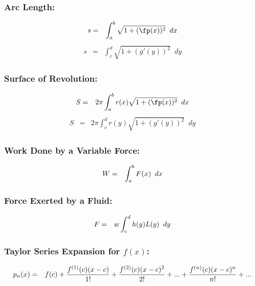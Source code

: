 \documentclass{article}[11pt]
\begin{document}
\pagebreak

\subsubsection*{\large{Arc Length:}}
\vspace{-0.25in}
\begin{eqnarray*}
s &=& \int_a^b{\sqrt{1+ (\fp(x))^2}}\phantom{a}dx  
\end{eqnarray*}
\begin{eqnarray*}
s &=& \int_c^d{\sqrt{1+ (g'(y))^2}}\phantom{a}dy 
\end{eqnarray*}
\vspace{0.1in}

\subsubsection*{\large{Surface of Revolution:}}
\vspace{-0.25in}
\begin{eqnarray*}
S &=& 2\pi \int_a^b{r(x) \sqrt{1+ (\fp(x))^2}}\phantom{a}dx  
\end{eqnarray*}
\begin{eqnarray*}
S &=& 2\pi \int_c^d{r(y) \sqrt{1+ (g'(y))^2}}\phantom{a}dy 
\end{eqnarray*}
\vspace{0.1in}

\subsubsection*{\large{Work Done by a Variable Force:}}
\begin{eqnarray*}
\vspace{-0.25in}
W &=& \int_a^b{F(x)}\phantom{a}dx  
\end{eqnarray*}
\vspace{0.1in}

\subsubsection*{\large{Force Exerted by a Fluid:}}
\begin{eqnarray*}
\vspace{-0.25in}
F &=& w \int_c^d{h(y) L(y)}\phantom{a}dy  
\end{eqnarray*}
\vspace{0.15in}

\subsubsection*{\large{Taylor Series Expansion for $f(x)$:}}
\begin{eqnarray*}
\vspace{-0.05in}
p_n(x) &=& f(c) + \frac{f^{(1)}(c)(x-c)}{1!} + \frac{f^{(2)}(c)(x-c)^2}{2!} + ... + \frac{f^{(n)}(c)(x-c)^n}{n!} + ... 
\end{eqnarray*}
\vspace{0.15in}
\end{document}
